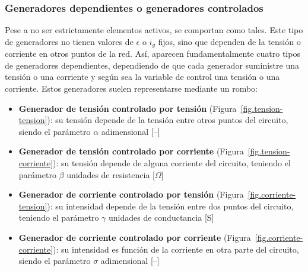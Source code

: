 	\subsubsection{Generadores dependientes o generadores controlados}
	Pese a no ser estrictamente elementos activos, se comportan como tales. Este tipo de generadores no tienen valores de $\epsilon$ o $i_g$ fijos, sino que dependen de la tensión o corriente en otros puntos de la red. Así, aparecen fundamentalmente cuatro tipos de generadores dependientes, dependiendo de que cada generador suministre una tensión o una corriente y según sea la variable de control una tensión o una corriente. Estos generadores suelen representarse mediante un rombo:
	\begin{itemize}
		\item \textbf{Generador de tensión controlado por tensión} (Figura~\ref{fig.tension-tension}): su tensión depende de la tensión entre otros puntos del circuito, siendo el parámetro $\alpha$ adimensional [--]
		\item \textbf{Generador de tensión controlado por corriente} (Figura~\ref{fig.tension-corriente}): su tensión depende de alguna corriente del circuito, teniendo el parámetro $\beta$ unidades de resistencia [$\Omega$]
		\item \textbf{Generador de corriente controlado por tensión} (Figura~\ref{fig.corriente-tension}): su intensidad depende de la tensión entre dos puntos del circuito, teniendo el parámetro $\gamma$ unidades de conductancia [S]
		\item \textbf{Generador de corriente controlado por corriente} (Figura~\ref{fig.corriente-corriente}): su intensidad es función de la corriente en otra parte del circuito, siendo el parámetro $\sigma$ adimensional [--]
	\end{itemize}
